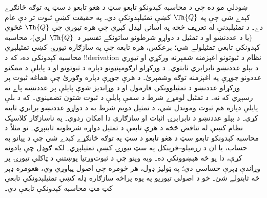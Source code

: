 \documentclass[../../../include/open-logic-section]{subfiles}
\begin{document}
\begin{explain}
ښودلې مو ده چې د محاسبه کېدونکو تابعو سټ د هغو تابعو د سټ په توګه ځانګړے کېدے شي چې په $\Th{Q}$ کښې تمثيلېدونکې دي۔ په حقيقت کښې ثبوت تر دې عام دے۔ د تمثيلېدنې له تعريف څخه په اسانۍ ليدل کېږي چې هره تيوري چې $\Th{Q}$ غځوي (يا د عددنښو او د تمثيل د دواړو شرطونو ساتونکے تفسير د~$\Th{Q}$ لري)، محاسبه کېدونکې تابعې تمثيلولے شي؛ برعکس، هره تابعه چې په سازګاره تيورۍ کښې تمثيلېږي محاسبه کېدونکې ده، که د !!{derivation} نظام د ثبوتونو اغېزمنه شمېرنه ورکړي او تيوري د بېلو عددنښو نابرابري ثابتوي۔ د ورکړلو ارګومېنټونو دپاره د ثبوتونو او د پايلې د ممکنو عددونو جوړې په اغېزمنه توګه وشمېرئ۔ د هرې جوړې دپاره وګورئ چې هماغه ثبوت پر ورکړلو عددنښو د تمثيلوونکي فارمول او د وړانديز شوې پايلې پر عددنښه پاے ته رسېږي که نه۔ د تمثيل لومړے شرط د سمې پايلې د ثبوت شتون تضمينوي۔ که د بلې پايلې دپاره هم ثبوت وموندل شي، د تمثيل دويم شرط به د دواړو عددنښو برابري ثابته کړي۔ د بېلو عددنښو د نابرابرۍ اثبات او سازګاري دا امکان ردوي۔ په ناسازګار کلاسيک نظام کښې له تناقض څخه د هرې تابعې د تمثيل دواړه شرطونه ثابتېږي۔ نو مثلاً د محاسبه کېدونکو تابعو سټ د هغو تابعو د سټ په توګه ځانګړے کېدے شي چې د پيانو په حساب، يا ان د زرمیلو--فرېنکل په سټ تيورۍ کښې تمثيلېږي۔ لکه ګوډل چې يادونه کړې، دا يو څه هېښوونکې ده۔ وبه وينو چې د ثبوت‌وړتيا پوښتنې د ټاکلې تيورۍ پر وړاندې ډېرې حساسې دي؛ په ټوليز ډول، هر څومره چې اصول پياوړي وي، هغومره ډېر څه ثابتولے شئ۔ خو د اصولي تيوريو په يوه پراخه سازګاره ډله کښې تمثيلېدونکې تابعې کټ مټ محاسبه کېدونکې تابعې دي۔ 
\end{explain}
\end{document}
